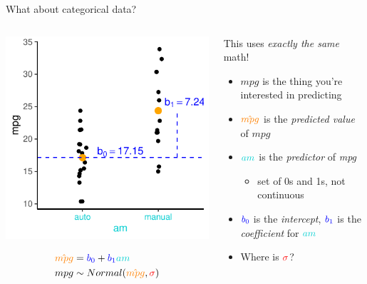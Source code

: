 \documentclass[
  ignorenonframetext,
  aspectratio=169]{beamer}
\providecommand{\tightlist}{%
  \setlength{\itemsep}{0pt}\setlength{\parskip}{0pt}}
\begin{document}
\begin{frame}{What about categorical data?}
\protect\hypertarget{what-about-categorical-data}{}
\begin{columns}[T]
\begin{column}{0.48\textwidth}
\includegraphics{03-Lecture_files/figure-beamer/unnamed-chunk-7-1.pdf}

\begin{equation*} 
\begin{split}
\textcolor{orange}{\hat{mpg}} & = \textcolor{blue}{b_0} + \textcolor{blue}{b_1}\textcolor{darkturquoise}{am} \\
mpg & \sim Normal(\textcolor{orange}{\hat{mpg}},\textcolor{red}{\sigma})
\end{split}
\end{equation*}
\end{column}

\begin{column}{0.48\textwidth}
This uses \emph{exactly the same} math!

\begin{itemize}[<+->]
\tightlist
\item
  \(mpg\) is the thing you're interested in predicting
\item
  \(\textcolor{orange}{\hat{mpg}}\) is the \emph{predicted value} of
  \(mpg\)
\item
  \(\textcolor{darkturquoise}{am}\) is the \emph{predictor} of
  \emph{mpg}

  \begin{itemize}[<+->]
  \tightlist
  \item
    set of 0s and 1s, not continuous
  \end{itemize}
\item
  \(\textcolor{blue}{b_0}\) is the \emph{intercept},
  \(\textcolor{blue}{b_1}\) is the \emph{coefficient} for
  \(\textcolor{darkturquoise}{am}\)
\item
  Where is \(\textcolor{red}{\sigma}\)?
\end{itemize}
\end{column}
\end{columns}
\end{frame}
\end{document}
